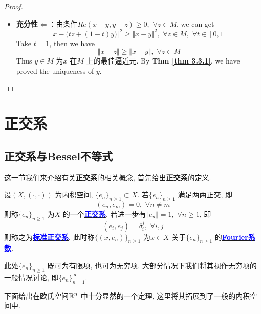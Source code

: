 \begin{thm}
\begin{proof}
\begin{itemize}
				\item \textbf{充分性$\Leftarrow$}：由条件$Re(x - y , y - z) \geq 0 , \,\, \forall z \in M$, we can get
				\[ \Big\Vert x - \Big( tz + (1 - t)y \Big) \Big\Vert^2 \geq \Vert x - y \Vert^2 , \,\, \forall z \in M , \,\, \forall t \in [0 , 1] \]
				Take $t = 1$, then we have
				\[ \Vert x - z \Vert \geq \Vert x - y \Vert , \,\, \forall z \in M \]
				Thus $y \in M$ 为$x$ 在$M$ 上的最佳逼近元. By \textbf{Thm \ref{thm 3.3.1}}, we have proved the uniqueness of $y$. 
			\end{itemize}
		\end{proof}
	\end{thm}

\newpage

\section{正交系}
\subsection{正交系与Bessel不等式}
	这一节我们来介绍有关\textbf{正交系}的相关概念, 首先给出\textbf{正交系}的定义. 
	
	\vspace{1em}
	
	\begin{defn}\label{def 3.4.1}
		设$(X , (\cdot , \cdot))$ 为内积空间, $\{ e_n \}_{n \geq 1} \subset X$. 若$\{ e_n \}_{n \geq 1}$ 满足两两正交, 即
		\[ (e_n , e_m) = 0 , \,\, \forall n \neq m \]
		则称$\{ e_n \}_{n \geq 1}$ 为$X$ 的一个\underline{\textcolor{blue}{\textbf{正交系}}}. 若进一步有$\Vert e_n \Vert = 1 , \,\, \forall n \geq 1$, 即
		\[ (e_i , e_j) = \delta_{i}^{j} , \,\, \forall i , j \]
		则称之为\underline{\textcolor{blue}{\textbf{标准正交系}}}, 此时称$\{ (x , e_n) \}_{n \geq 1}$ 为$x \in X$ 关于$\{ e_n \}_{n \geq 1}$ 的\underline{\textcolor{blue}{\textbf{Fourier系数}}}. 
		
		\vspace{2em}
		
		\begin{rmk}
			此处$\{ e_n \}_{n \geq 1}$ 既可为有限项, 也可为无穷项. 大部分情况下我们将其视作无穷项的一般情况讨论, 即$\{ e_n \}_{n = 1}^{\infty}$.
		\end{rmk}
	\end{defn}
	
	\vspace{6em}
	
	下面给出在欧氏空间$\mathbb{R}^n$ 中十分显然的一个定理, 这里将其拓展到了一般的内积空间中. 
	
